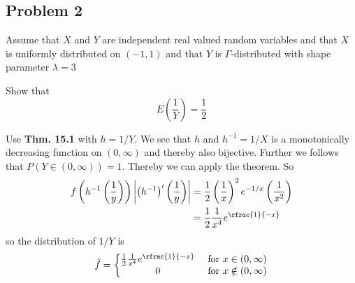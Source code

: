 \subsection{Problem 2} %
Assume that \(X\) and \(Y\) are independent real valued random variables  and that \(X\) is uniformly distributed on \((-1,1)\) and that \(Y\) is \(\Gamma\)-distributed with shape parameter \(\lambda=3\)
\begin{problem}
Show  that
\[
	E\left(\frac{1}{Y}\right)=\frac{1}{2}
\]
\end{problem}
\begin{solution}
Use \textbf{Thm. 15.1} with \(h=1/Y\). We see that \(h\) and  \(h^{-1}=1/X\)  is a monotonically decreasing function on \((0,\infty)\) and thereby also bijective. Further we follows that \(P(Y\in (0,\infty))=1\). Thereby we can apply the theorem. So
\begin{align}
    f\left(h^{-1}\left(\frac{1}{y}\right)\right)\left| \left(h^{-1}\right)'\left(\frac{1}{y}\right)\right|&=\frac{1}{2}\left(\frac{1}{x}\right)^{2}e^{-1/x}\left(\frac{1}{x^2}\right)\\
    & = \frac{1}{2}\frac{1}{x^4}e^{\rfrac{1}{-x}}
\end{align}
so the distribution of \(1/Y\) is
\[
	\tilde{f}=\left\{
	\begin{matrix}
	 \frac{1}{2}\frac{1}{x^4}e^{\rfrac{1}{-x}} & \text{ for } x\in(0,\infty) \\
	 0 & \text{ for } x\notin (0,\infty)
	 \end{matrix} \right.
\]


\end{solution}
